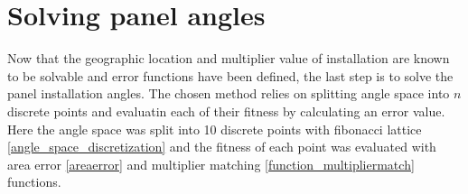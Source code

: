 \newpage
\section{Solving panel angles}
Now that the geographic location and multiplier value of installation are known to be solvable and error functions have been defined, the last step is to solve the panel installation angles. The chosen method relies on splitting angle space into $n$ discrete points and evaluatin each of their fitness by calculating an error value. Here the angle space was split into 10 discrete points with fibonacci lattice \ref{angle_space_discretization} and the fitness of each point was evaluated with area error \ref{areaerror} and multiplier matching \ref{function_multipliermatch} functions. %



